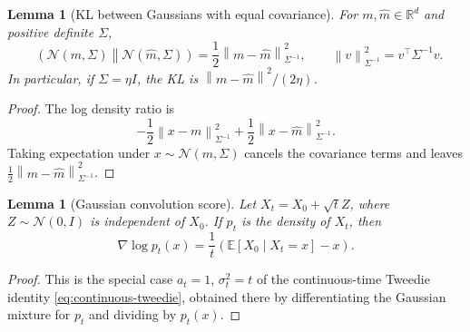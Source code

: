 \documentclass{amsart}
\numberwithin{equation}{section}
\theoremstyle{plain}
\newtheorem{lemma}[theorem]{Lemma}
\theoremstyle{definition}
\theoremstyle{remark}
\DeclareMathOperator{\KL}{D_{\mathsf{KL}}}
\newcommand{\R}{\mathbb{R}}
\newcommand{\E}{\mathbb{E}}
\newcommand{\Id}{I}
\newcommand{\wh}[1]{\widehat{#1}}
\newcommand{\norm}[1]{\left\lVert #1 \right\rVert}
\newcommand{\normal}[2]{\mathcal{N}\!\left(#1,#2\right)}
\begin{document}
\begin{lemma}[KL between Gaussians with equal covariance]\label{lem:gaussian-kl}
For $m,\wh m\in\R^d$ and positive definite $\Sigma$,
\[
    \KL\!\left(\normal{m}{\Sigma}\middle\|\normal{\wh m}{\Sigma}\right)
    =
    \frac12\norm{m-\wh m}_{\Sigma^{-1}}^2,
    \qquad
    \norm v_{\Sigma^{-1}}^2=v^\top\Sigma^{-1}v.
\]
In particular, if $\Sigma=\eta\Id$, the KL is
$\norm{m-\wh m}^2/(2\eta)$.
\end{lemma}

\begin{proof}
The log density ratio is
\[
    -\frac12\norm{x-m}_{\Sigma^{-1}}^2
    +\frac12\norm{x-\wh m}_{\Sigma^{-1}}^2.
\]
Taking expectation under $x\sim\normal{m}{\Sigma}$ cancels the covariance
terms and leaves $\frac12\norm{m-\wh m}_{\Sigma^{-1}}^2$.
\end{proof}

\begin{lemma}[Gaussian convolution score]
Let $X_t=X_0+\sqrt t Z$, where $Z\sim\normal{0}{\Id}$ is independent of $X_0$.
If $p_t$ is the density of $X_t$, then
\[
    \nabla\log p_t(x)
    =
    \frac{1}{t}\left(\E[X_0\mid X_t=x]-x\right).
\]
\end{lemma}

\begin{proof}
This is the special case $a_t=1$, $\sigma_t^2=t$ of the continuous-time Tweedie
identity \eqref{eq:continuous-tweedie}, obtained there by differentiating the
Gaussian mixture for $p_t$ and dividing by $p_t(x)$.
\end{proof}



\end{document}
